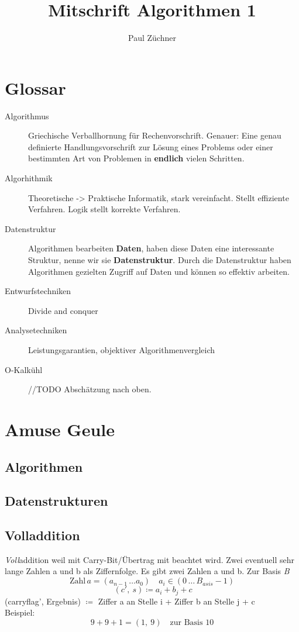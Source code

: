 \documentclass[a4paper]{scrartcl}
\title{Mitschrift Algorithmen 1}
\author{Paul Züchner}
\begin{document}
\maketitle

\tableofcontents


\newpage
\section{Glossar}
\begin{description}  
	\item[Algorithmus] 
		Griechische Verballhornung für Rechenvorschrift. Genauer: Eine genau definierte Handlungsvorschrift zur Lösung eines Problems oder einer bestimmten Art von Problemen in \textbf{endlich} vielen Schritten.
	
	\item[Algorhithmik] 
		Theoretische -> Praktische Informatik, stark vereinfacht. Stellt effiziente Verfahren. Logik stellt korrekte Verfahren. 
	
	\item[Datenstruktur] 
		Algorithmen bearbeiten \textbf{Daten}, haben diese Daten eine interessante Struktur, nenne wir sie \textbf{Datenstruktur}. Durch die Datenstruktur haben Algorithmen gezielten Zugriff auf Daten und können so effektiv arbeiten.
	
	\item[Entwurfstechniken] 
		Divide and conquer
	
	\item[Analysetechniken] 
		Leistungsgarantien, objektiver Algorithmenvergleich
	
	\item[O-Kalkühl] 
		//TODO Abschätzung nach oben.
\end{description}

\section{Amuse Geule}
	\subsection{Algorithmen}
	\subsection{Datenstrukturen}
	
	\subsection{Volladdition}
		\emph{Voll}addition weil mit Carry-Bit/Übertrag mit beachtet wird. Zwei eventuell sehr lange Zahlen a und b als Ziffernfolge. Es gibt zwei Zahlen a und b. Zur Basis \emph{B} 
		 \[ \text{Zahl} \, a = (a_{n-1} \, \dots a_0) \quad a_i \in (0 \, \dots \, B_{asis} - 1) \]
	 	\[\ (c', \: s ) \coloneqq  a_i + b_j + c\] 
	 	(carryflag', Ergebnis) \( \coloneqq \) Ziffer a an Stelle i + Ziffer b an Stelle j + c\\
	 	Beispiel: 
	 	\[9 + 9 +1 = (1, \: 9) \quad \text{zur Basis 10}\]
	 		
\end{document}
